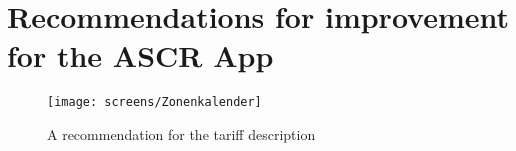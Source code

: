 \section{Recommendations for improvement for the ASCR App}

\begin{figure}[h]
	\centering
	\texttt{[image: screens/Zonenkalender]}
	\caption{A recommendation for the tariff description }
	\label{fig:kalender} %
\end{figure}

